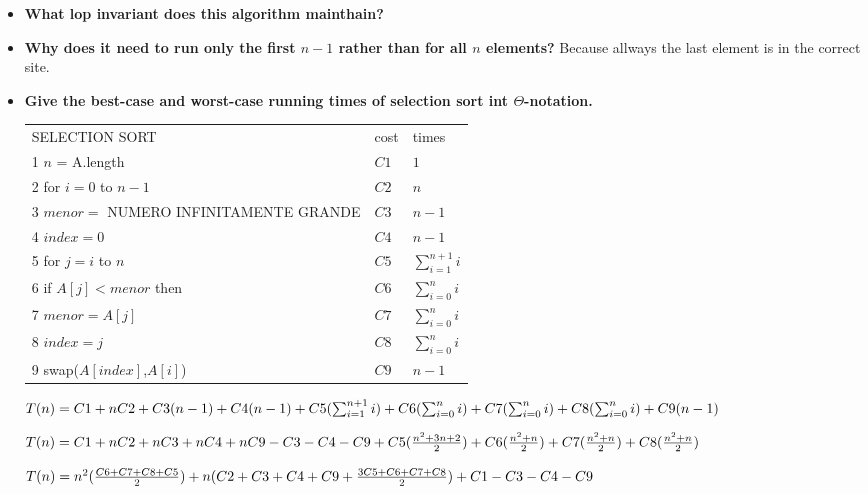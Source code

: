 \documentclass[a4paper,12pt]{article}
\begin{document}
    \begin{itemize}
     \item  \textbf {What lop invariant does this algorithm mainthain?}
     
     \item \textbf{ Why does it need to run only the first $n-1$ rather than for all $n$ elements?}  
	  \hspace{2mm} Because allways the last element is in the correct site.
     
     \item \textbf{Give the best-case and worst-case running times of
     selection sort int $\Theta$-notation.}
     
     \begin{tabular}{l l l}
      SELECTION SORT & cost & times \\
      1	$n$ = A.length & $C1$ & $1$ \\
      2 for $i = 0$ to $n-1$ & $C2$ & $n$ \\
      3	\hspace{0.5cm} $menor =$ NUMERO INFINITAMENTE GRANDE & $C3$ & $n-1$ \\
      4 \hspace{0.5cm} $index = 0$ & $C4$ & $n-1$ \\
      5	\hspace{0.5cm} for $j = i$ to $n$ & $C5$ & $\sum_{i=1}^{n+1} i$ \\
      6 \hspace{1cm} if $A[j] <  menor$ then & $C6$ & $\sum_{i=0}^{n} i$ \\
      7 \hspace{1.5cm} $menor = A[j]$ & $C7$ & $\sum_{i=0}^{n} i$ \\
      8 \hspace{1.5cm} $index = j$ & $C8$ & $\sum_{i=0}^{n} i$ \\
      9 \hspace{0.5cm} swap($A[index]$,$A[i]$) & $C9$ & $n-1$	
     \end{tabular}

     
     
      $ T(n) = C1 + nC2 + C3(n-1) + C4(n-1) + C5(\sum_{i=1}^{n+1} i) \\     
	+  C6(\sum_{i=0}^{n} i) + C7(\sum_{i=0}^{n} i) + C8(\sum_{i=0}^{n} i) + C9(n-1)	\\
    $
	
	$T(n) = C1 + nC2 + nC3 + nC4 + nC9 - C3 - C4 - C9 + C5(\frac{n^2+3n+2}{2}) \\
         +  C6(\frac{n^2+n}{2}) + C7(\frac{n^2+n}{2}) + C8(\frac{n^2+n}{2})   
    $
     
     $ T(n) = n^2(\frac{C6+C7+C8+C5}{2}) + n(C2+C3+C4+C9 + \frac{3C5+C6+C7+C8}{2}) \\
       + C1 - C3 - C4 - C9$
  
     
    \end{itemize}

    
    
    
\end{document}
